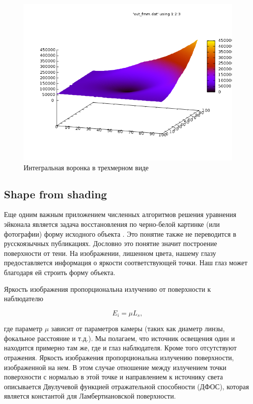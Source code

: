 \begin{figure}[H]
  \centering
  \includegraphics[width=\linewidth]{img/impulse-example.png}
  \hfil \caption{Интегральная воронка в трехмерном виде}
  \label{fig:impulse-example}
\end{figure}


\subsection{Shape from shading}
\label{sec:shape-from-shading}

Еще одним важным приложением численных алгоритмов решения уравнения
эйконала является задача восстановления по черно-белой картинке (или
фотографии) форму исходного объекта \cite{SFS2009}. Это понятие также
не переводится в русскоязычных публикациях. Дословно это понятие
значит построение поверхности от тени. На изображении, лишенном цвета,
нашему глазу предоставляется информация о яркости соответствующей
точки. Наш глаз может благодаря ей строить форму объекта.  

Яркость изображения пропорциональна излучению от поверхности к
наблюдателю

\begin{equation}
  \label{eq:sfs:1}
  E_i=\mu L_s,
\end{equation}

где параметр $\mu$ зависит от параметров камеры (таких как диаметр
линзы, фокальное расстояние и т.д.).
Мы полагаем, что источник освещения один и находится примерно там же,
где и глаз наблюдателя. Кроме того отсутствуют отражения. Яркость
изображения пропорциональна излучению поверхности, изображенной на
нем. В этом случае отношение между излучением точки поверхности с
нормалью в этой точке и направлением к источнику света описывается 
Двулучевой функцией отражательной способности (ДФОС), которая является
константой для Ламбертиановской поверхности.

